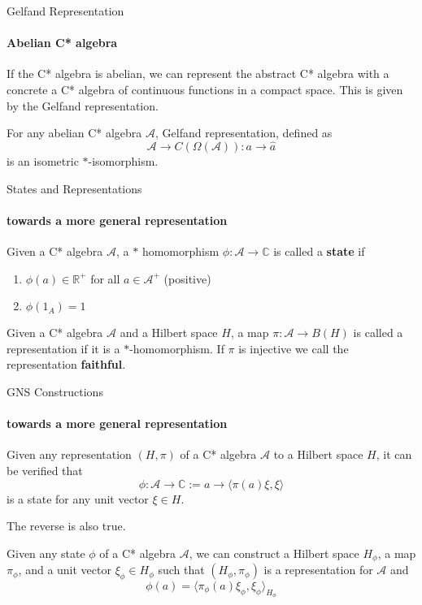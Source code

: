\documentclass[dvipsnames]{beamer}
\newcommand{\1}{\mathds{1}}	%
\begin{document}
\begin{frame}{Gelfand Representation}
\framesubtitle{Abelian C* algebra}
If the C* algebra is abelian, we can represent the abstract C* algebra with a concrete a C* algebra of continuous functions in a compact space. \pause This is given by the Gelfand representation.
\pause

\begin{theorem}[Gelfand]
  For any abelian C* algebra $\mathcal{A}$, Gelfand representation, defined as $$\mathcal{A} \to C(\Omega(\mathcal{A})): a \to \hat{a}$$
  is an isometric $*$-isomorphism.
\end{theorem}
\end{frame}

\begin{frame}{States and Representations}
  \framesubtitle{towards a more general representation }
  \begin{definition}
    Given a C* algebra $\mathcal{A}$, a $*$ homomorphism $\phi: \mathcal{A} \to \mathbb{C}$ is called a {\bf state} if \pause
    \begin{enumerate}
      \item $\phi(a) \in \mathbb{R}^+$ for all $a \in \mathcal{A}^+$ (positive) \pause
      \item $\phi(1_A) = 1$
    \end{enumerate}
  \end{definition}
  \pause
  \begin{definition}
    Given a C* algebra $\mathcal{A}$ and a Hilbert space $H$, a map $\pi: \mathcal{A} \to B(H)$ is called a representation if it is a $*$-homomorphism. \pause If $\pi$ is injective we call the representation {\bf faithful}.
  \end{definition}
\end{frame}

\begin{frame}{GNS Constructions}
  \framesubtitle{towards a more general representation }
  Given any representation $(H, \pi)$ of a C* algebra $\mathcal{A}$ to a Hilbert space $H$, it can be verified that $$\phi: \mathcal{A} \to \mathbb{C}:= a \to \langle \pi(a) \xi, \xi \rangle$$
  is a state for any unit vector $\xi \in H$.

  \pause

  The reverse is also true.

  \pause

  Given any state $\phi$ of a C* algebra $\mathcal{A}$, we can construct a Hilbert space $H_\phi$, a map $\pi_\phi$, and a unit vector $\xi_\phi \in H_\phi$ such that $(H_\phi, \pi_\phi)$ is a representation for $\mathcal{A}$ and $$\phi(a) = \langle \pi_\phi(a) \xi_\phi, \xi_\phi \rangle_{H_\phi}$$
\end{frame}
\end{document}
